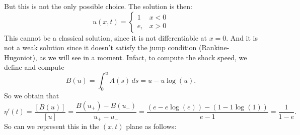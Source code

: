 \begin{itemize}
\[          \]
          But this is not the only possible choice. The solution is then:
          \[
              u(x,t) = \begin{cases}
                  1  & x < 0 \\
                  e, & x > 0
              \end{cases}
          \]
          This cannot be a classical solution, since it is not differentiable at \(x=0\).
          And it is not a weak solution since it doesn't satisfy the jump condition
          (Rankine-Hugoniot), as we will see in a moment. Infact, to compute the shock
          speed, we define and compute
          \[B(u) = \int_0^u A(s) \, ds = u - u \log(u).\]
          So we obtain that
          \[
              \eta'(t) = \frac{[B(u)]}{[u]} = \frac{B(u_+)- B(u_-)}{u_+-u_-} = \frac{(e - e \log(e)) - (1 - 1 \log(1))}{e - 1} = \frac{1}{1-e}.
          \]
          So can we represent this in the \((x,t)\) plane as follows:
          \begin{center}
\end{center}
\end{itemize}
